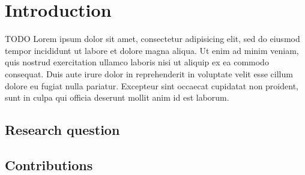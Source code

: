 
\section{Introduction \label{sec:introduction}}
{\color{red}TODO}
Lorem ipsum dolor sit amet, consectetur adipisicing elit, sed do eiusmod tempor incididunt ut labore et dolore magna aliqua. Ut enim ad minim veniam, quis nostrud exercitation ullamco laboris nisi ut aliquip ex ea commodo consequat. Duis aute irure dolor in reprehenderit in voluptate velit esse cillum dolore eu fugiat nulla pariatur. Excepteur sint occaecat cupidatat non proident, sunt in culpa qui officia deserunt mollit anim id est laborum.

\subsection{Research question}
\subsection{Contributions}

